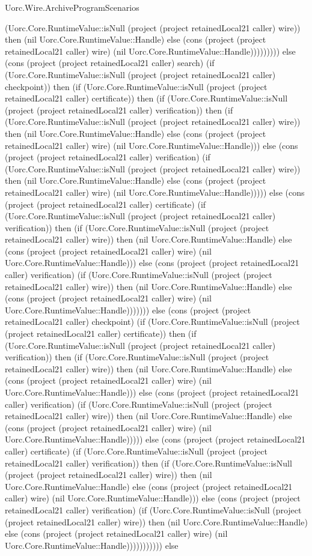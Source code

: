 \begin{lexlean}{Uorc.Wire.ArchiveProgramScenarios}
\begin{semanticmodule}
{(Uorc.Core.RuntimeValue::isNull (project (project retainedLocal21 caller) wire)) then (nil Uorc.Core.RuntimeValue::Handle) else (cons (project (project retainedLocal21 caller) wire) (nil Uorc.Core.RuntimeValue::Handle))))))))) else (cons (project (project retainedLocal21 caller) search) (if (Uorc.Core.RuntimeValue::isNull (project (project retainedLocal21 caller) checkpoint)) then (if (Uorc.Core.RuntimeValue::isNull (project (project retainedLocal21 caller) certificate)) then (if (Uorc.Core.RuntimeValue::isNull (project (project retainedLocal21 caller) verification)) then (if (Uorc.Core.RuntimeValue::isNull (project (project retainedLocal21 caller) wire)) then (nil Uorc.Core.RuntimeValue::Handle) else (cons (project (project retainedLocal21 caller) wire) (nil Uorc.Core.RuntimeValue::Handle))) else (cons (project (project retainedLocal21 caller) verification) (if (Uorc.Core.RuntimeValue::isNull (project (project retainedLocal21 caller) wire)) then (nil Uorc.Core.RuntimeValue::Handle) else (cons (project (project retainedLocal21 caller) wire) (nil Uorc.Core.RuntimeValue::Handle))))) else (cons (project (project retainedLocal21 caller) certificate) (if (Uorc.Core.RuntimeValue::isNull (project (project retainedLocal21 caller) verification)) then (if (Uorc.Core.RuntimeValue::isNull (project (project retainedLocal21 caller) wire)) then (nil Uorc.Core.RuntimeValue::Handle) else (cons (project (project retainedLocal21 caller) wire) (nil Uorc.Core.RuntimeValue::Handle))) else (cons (project (project retainedLocal21 caller) verification) (if (Uorc.Core.RuntimeValue::isNull (project (project retainedLocal21 caller) wire)) then (nil Uorc.Core.RuntimeValue::Handle) else (cons (project (project retainedLocal21 caller) wire) (nil Uorc.Core.RuntimeValue::Handle))))))) else (cons (project (project retainedLocal21 caller) checkpoint) (if (Uorc.Core.RuntimeValue::isNull (project (project retainedLocal21 caller) certificate)) then (if (Uorc.Core.RuntimeValue::isNull (project (project retainedLocal21 caller) verification)) then (if (Uorc.Core.RuntimeValue::isNull (project (project retainedLocal21 caller) wire)) then (nil Uorc.Core.RuntimeValue::Handle) else (cons (project (project retainedLocal21 caller) wire) (nil Uorc.Core.RuntimeValue::Handle))) else (cons (project (project retainedLocal21 caller) verification) (if (Uorc.Core.RuntimeValue::isNull (project (project retainedLocal21 caller) wire)) then (nil Uorc.Core.RuntimeValue::Handle) else (cons (project (project retainedLocal21 caller) wire) (nil Uorc.Core.RuntimeValue::Handle))))) else (cons (project (project retainedLocal21 caller) certificate) (if (Uorc.Core.RuntimeValue::isNull (project (project retainedLocal21 caller) verification)) then (if (Uorc.Core.RuntimeValue::isNull (project (project retainedLocal21 caller) wire)) then (nil Uorc.Core.RuntimeValue::Handle) else (cons (project (project retainedLocal21 caller) wire) (nil Uorc.Core.RuntimeValue::Handle))) else (cons (project (project retainedLocal21 caller) verification) (if (Uorc.Core.RuntimeValue::isNull (project (project retainedLocal21 caller) wire)) then (nil Uorc.Core.RuntimeValue::Handle) else (cons (project (project retainedLocal21 caller) wire) (nil Uorc.Core.RuntimeValue::Handle))))))))))) else }
\end{semanticmodule}
\end{lexlean}
